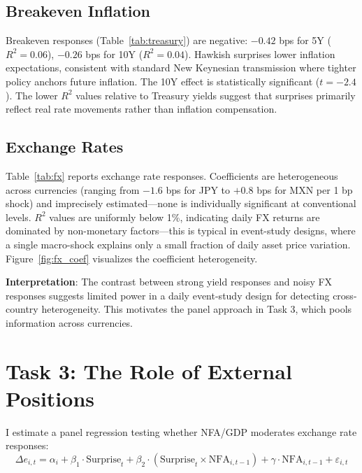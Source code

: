 \documentclass[12pt]{article}
\begin{document}
\subsection*{Breakeven Inflation}

Breakeven responses (Table~\ref{tab:treasury}) are negative: $-0.42$ bps for 5Y ($R^2 = 0.06$), $-0.26$ bps for 10Y ($R^2 = 0.04$). Hawkish surprises lower inflation expectations, consistent with standard New Keynesian transmission where tighter policy anchors future inflation. The 10Y effect is statistically significant ($t = -2.4$). The lower $R^2$ values relative to Treasury yields suggest that surprises primarily reflect real rate movements rather than inflation compensation.

\subsection*{Exchange Rates}

Table~\ref{tab:fx} reports exchange rate responses. Coefficients are heterogeneous across currencies (ranging from $-1.6$ bps for JPY to $+0.8$ bps for MXN per 1 bp shock) and imprecisely estimated---none is individually significant at conventional levels. $R^2$ values are uniformly below 1\%, indicating daily FX returns are dominated by non-monetary factors---this is typical in event-study designs, where a single macro-shock explains only a small fraction of daily asset price variation. Figure~\ref{fig:fx_coef} visualizes the coefficient heterogeneity.

\textbf{Interpretation}: The contrast between strong yield responses and noisy FX responses suggests limited power in a daily event-study design for detecting cross-country heterogeneity. This motivates the panel approach in Task 3, which pools information across currencies.

\section*{Task 3: The Role of External Positions}

I estimate a panel regression testing whether NFA/GDP moderates exchange rate responses:
\begin{equation}
\Delta e_{i,t} = \alpha_i + \beta_1 \cdot \text{Surprise}_t + \beta_2 \cdot (\text{Surprise}_t \times \text{NFA}_{i,t-1}) + \gamma \cdot \text{NFA}_{i,t-1} + \varepsilon_{i,t}
\end{equation}
\end{document}

